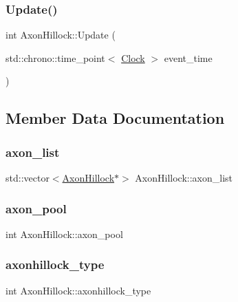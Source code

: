 \subsubsection{\texorpdfstring{Update()}{Update()}}
{\footnotesize\ttfamily int Axon\+Hillock\+::\+Update (\begin{DoxyParamCaption}\item[{std\+::chrono\+::time\+\_\+point$<$ \mbox{\hyperlink{universe_8h_a0ef8d951d1ca5ab3cfaf7ab4c7a6fd80}{Clock}} $>$}]{event\+\_\+time }\end{DoxyParamCaption})}



\subsection{Member Data Documentation}
\mbox{\label{classAxonHillock_a110d655ded8e09306b224b6e940cd60b}} 
\subsubsection{\texorpdfstring{axon\+\_\+list}{axon\_list}}
{\footnotesize\ttfamily std\+::vector$<$\mbox{\hyperlink{classAxonHillock}{Axon\+Hillock}}$\ast$$>$ Axon\+Hillock\+::axon\+\_\+list\hspace{0.3cm}{\ttfamily [protected]}}

\mbox{\label{classAxonHillock_a5128d2562b42d29b7bfc1492bfce7066}} 
\subsubsection{\texorpdfstring{axon\+\_\+pool}{axon\_pool}}
{\footnotesize\ttfamily int Axon\+Hillock\+::axon\+\_\+pool\hspace{0.3cm}{\ttfamily [private]}}

\mbox{\label{classAxonHillock_abcf4792c5f64683a2ba6b3ad11b36c3b}} 
\subsubsection{\texorpdfstring{axonhillock\+\_\+type}{axonhillock\_type}}
{\footnotesize\ttfamily int Axon\+Hillock\+::axonhillock\+\_\+type\hspace{0.3cm}{\ttfamily [private]}}

